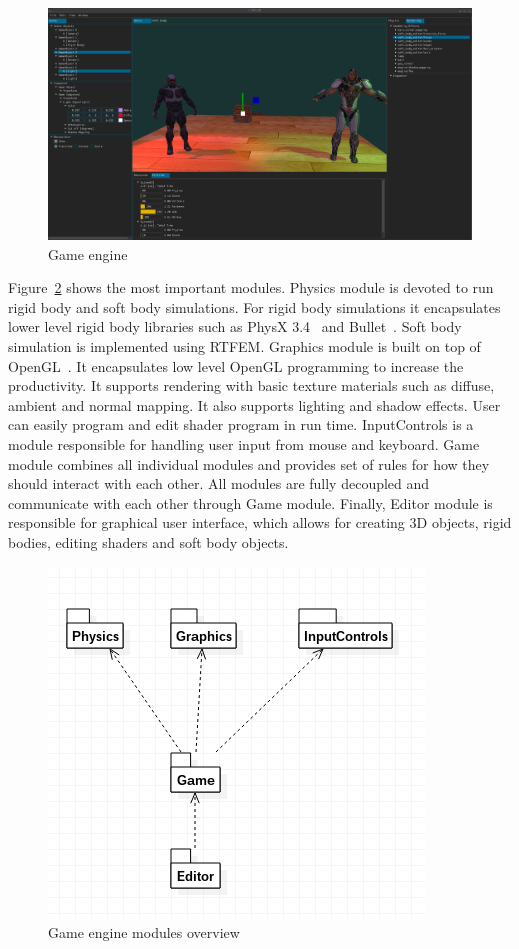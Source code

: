 \documentclass[en]{minipw} %
\begin{document}
\begin{figure}[h!]
\centering
\includegraphics[scale=0.2]{pictures/ifx/ifx.png}
\caption[Game engine]{Game engine~\cite{ifx}}
\label{fig:ifx_example}
\end{figure}

Figure~\ref{fig:ifx_general} shows the most important modules. Physics module is devoted to run rigid body and soft body simulations. For rigid body simulations it encapsulates lower level rigid body libraries such as PhysX 3.4~\cite{physx} and Bullet~\cite{bullet}. Soft body simulation is implemented using RTFEM.
Graphics module is built on top of OpenGL~\cite{opengl}. It encapsulates low level OpenGL programming to increase the productivity. It supports rendering with basic texture materials such as diffuse, ambient and normal mapping. It also supports lighting and shadow effects. User can easily program and edit shader program in run time.
InputControls is a module responsible for handling user input from mouse and keyboard.
Game module combines all individual modules and provides set of rules for how they should interact with each other. All modules are fully decoupled and communicate with each other through Game module.
Finally, Editor module is responsible for graphical user interface, which allows for creating 3D objects, rigid bodies, editing shaders and soft body objects.

\begin{figure}[h!]
\centering
\includegraphics[scale=0.5]{pictures/ifx_general.png}
\caption[Game engine modules overview]{Game engine modules overview}
\label{fig:ifx_general}
\end{figure}
\end{document}
